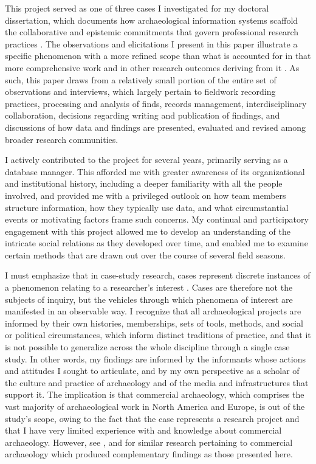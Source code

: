 \documentclass[
]{article}
\begin{document}
This project served as one of three cases I investigated for my doctoral
dissertation, which documents how archaeological information systems
scaffold the collaborative and epistemic commitments that govern
professional research practices \autocite{batist2023}. The observations
and elicitations I present in this paper illustrate a specific
phenomenon with a more refined scope than what is accounted for in that
more comprehensive work and in other research outcomes deriving from it
\autocites[cf.][]{batist-alienation,batist2024a,batist2021}. As such,
this paper draws from a relatively small portion of the entire set of
observations and interviews, which largely pertain to fieldwork
recording practices, processing and analysis of finds, records
management, interdisciplinary collaboration, decisions regarding writing
and publication of findings, and discussions of how data and findings
are presented, evaluated and revised among broader research communities.

I actively contributed to the project for several years, primarily
serving as a database manager. This afforded me with greater awareness
of its organizational and institutional history, including a deeper
familiarity with all the people involved, and provided me with a
privileged outlook on how team members structure information, how they
typically use data, and what circumstantial events or motivating factors
frame such concerns. My continual and participatory engagement with this
project allowed me to develop an understanding of the intricate social
relations as they developed over time, and enabled me to examine certain
methods that are drawn out over the course of several field seasons.

I must emphasize that in case-study research, cases represent discrete
instances of a phenomenon relating to a researcher's interest
\autocite{ragin1992}. Cases are therefore not the subjects of inquiry,
but the vehicles through which phenomena of interest are manifested in
an observable way. I recognize that all archaeological projects are
informed by their own histories, memberships, sets of tools, methods,
and social or political circumstances, which inform distinct traditions
of practice, and that it is not possible to generalize across the whole
discipline through a single case study. In other words, my findings are
informed by the informants whose actions and attitudes I sought to
articulate, and by my own perspective as a scholar of the culture and
practice of archaeology and of the media and infrastructures that
support it. The implication is that commercial archaeology, which
comprises the vast majority of archaeological work in North America and
Europe, is out of the study's scope, owing to the fact that the case
represents a research project and that I have very limited experience
with and knowledge about commercial archaeology. However, see
\textcite{chadwick1998}, \textcite{thorpe2012} and \textcite{zorzin2015}
for similar research pertaining to commercial archaeology which produced
complementary findings as those presented here.
\end{document}
